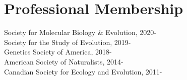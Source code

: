 \documentclass[12pt]{article}
\begin{document}
\section*{Professional Membership}

\noindent Society for Molecular Biology \& Evolution, 2020-\\
\noindent Society for the Study of Evolution, 2019- \\
\noindent Genetics Society of America, 2018- \\
\noindent American Society of Naturalists, 2014- \\
\noindent Canadian Society for Ecology and Evolution, 2011-
\end{document}
